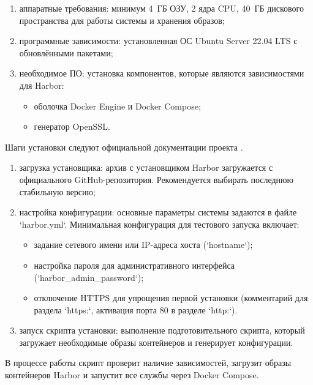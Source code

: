 \begin{enumerate}
	\item аппаратные требования: минимум 4~ГБ ОЗУ, 2 ядра CPU, 40~ГБ дискового пространства для работы системы и хранения образов;
	\item программные зависимости: установленная ОС Ubuntu Server 22.04 LTS с обновлёнными пакетами;
	\item необходимое ПО: установка компонентов, которые являются зависимостями для Harbor:
	\begin{itemize}
		\item оболочка Docker Engine и Docker Compose;
		\item генератор OpenSSL.
	\end{itemize}
\end{enumerate}


Шаги установки следуют официальной документации проекта \cite{harbor-docs}.

\begin{enumerate}
	\item загрузка установщика: архив с установщиком Harbor загружается с официального GitHub-репозитория. Рекомендуется выбирать последнюю стабильную версию;
	
	\item настройка конфигурации: основные параметры системы задаются в файле `harbor.yml`. Минимальная конфигурация для тестового запуска включает:
	\begin{itemize}
		\item задание сетевого имени или IP-адреса хоста (`hostname`);
		\item настройка пароля для административного интерфейса (`harbor\_admin\_password`);
		\item отключение HTTPS для упрощения первой установки (комментарий для раздела `https:`, активация порта 80 в разделе `http:`).
	\end{itemize}
	
	\item запуск скрипта установки: выполнение подготовительного скрипта, который загружает необходимые образы контейнеров и генерирует конфигурации.
\end{enumerate}

В процессе работы скрипт проверит наличие зависимостей, загрузит образы контейнеров Harbor и запустит все службы через Docker Compose.


